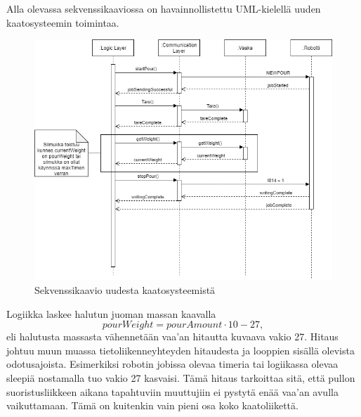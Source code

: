 Alla olevassa sekvenssikaaviossa on havainnollistettu UML-kielellä uuden kaatosysteemin toimintaa.

\begin{figure}[h]
\begin{center}
\includegraphics[scale=0.6]{img/Sequence.png}
\end{center}
\caption{Sekvenssikaavio uudesta kaatosysteemistä}
\label{fig:Sequence}
\end{figure}

Logiikka laskee halutun juoman massan kaavalla
\[pourWeight = pourAmount \cdot 10  - 27, \]
eli halutusta massasta vähennetään vaa'an hitautta kuvaava vakio 27. Hitaus johtuu muun muassa tietoliikenneyhteyden hitaudesta ja looppien sisällä olevista odotusajoista. Esimerkiksi robotin jobissa olevaa timeria tai logiikassa olevaa sleepiä nostamalla tuo vakio 27 kasvaisi. Tämä hitaus tarkoittaa sitä, että pullon suoristusliikkeen aikana tapahtuviin muuttujiin ei pystytä enää vaa'an avulla vaikuttamaan. Tämä on kuitenkin vain pieni osa koko kaatoliikettä.
